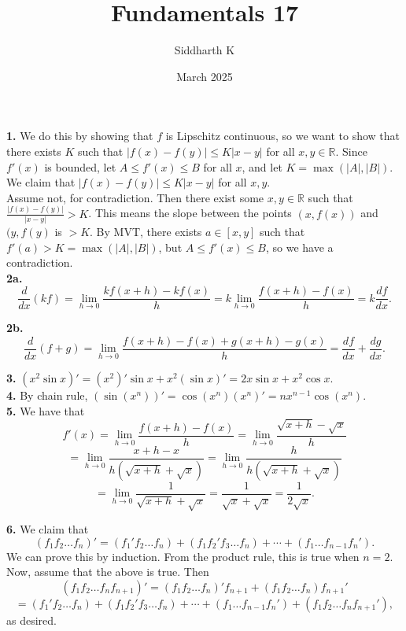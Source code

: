 \documentclass{article}
\title{Fundamentals 17}
\author{Siddharth K}
\date{March 2025}
\newcommand{\R}{\mathbb{R}}
\begin{document}
\maketitle

\textbf{1.} We do this by showing that $f$ is Lipschitz continuous, so we want to show that there exists $K$ such that $|f(x) - f(y)| \le K|x - y|$ for all $x, y \in \R$. Since $f'(x)$ is bounded, let $A \le f'(x) \le B$ for all $x$, and let $K = \max(|A|, |B|)$. We claim that $|f(x) - f(y)| \le K|x - y|$ for all $x, y$. \\

Assume not, for contradiction. Then there exist some $x, y \in \R$ such that $\frac{|f(x) - f(y)|}{|x - y|} > K$. This means the slope between the points $(x, f(x))$ and $(y, f(y)$ is $> K$. By MVT, there exists $a \in [x, y]$ such that $f'(a) > K = \max(|A|, |B|)$, but $A \le f'(x) \le B$, so we have a contradiction. \\

\textbf{2a.} $$\frac{d}{dx}(kf) = \lim_{h\to 0} \frac{kf(x + h) - kf(x)}{h} = k\lim_{h\to 0} \frac{f(x + h) - f(x)}{h} = k\frac{df}{dx}.$$

\textbf{2b.} $$\frac{d}{dx}(f + g) = \lim_{h\to 0} \frac{f(x + h) - f(x) + g(x + h) - g(x)}{h} = \frac{df}{dx} + \frac{dg}{dx}.$$

\textbf{3.} $(x^2\sin x)' = (x^2)'\sin x + x^2(\sin x)' = 2x\sin x + x^2\cos x$. \\

\textbf{4.} By chain rule, $(\sin(x^n))' = \cos(x^n)(x^n)' = nx^{n - 1}\cos(x^n)$. \\

\textbf{5.} We have that
$$f'(x) = \lim_{h\to 0} \frac{f(x + h) - f(x)}{h} = \lim_{h\to 0} \frac{\sqrt{x + h} - \sqrt{x}}{h}$$
$$= \lim_{h\to 0} \frac{x + h - x}{h(\sqrt{x + h} + \sqrt{x})} = \lim_{h\to 0} \frac{h}{h(\sqrt{x + h} + \sqrt{x})}$$
$$= \lim_{h\to 0} \frac{1}{\sqrt{x + h} + \sqrt{x}} = \frac{1}{\sqrt{x} + \sqrt{x}} = \frac{1}{2\sqrt{x}}.$$

\textbf{6.} We claim that
$$(f_1f_2\ldots f_n)' = (f_1'f_2\ldots f_n) + (f_1f_2'f_3\ldots f_n) + \cdots + (f_1\ldots f_{n - 1}f_n').$$
We can prove this by induction. From the product rule, this is true when $n = 2$. Now, assume that the above is true. Then
$$(f_1f_2\ldots f_nf_{n + 1})' = (f_1f_2\ldots f_n)'f_{n + 1} + (f_1f_2\ldots f_n)f_{n + 1}'$$
$$= (f_1'f_2\ldots f_n) + (f_1f_2'f_3\ldots f_n) + \cdots + (f_1\ldots f_{n - 1}f_n') + (f_1f_2\ldots f_nf_{n + 1}'),$$
as desired. \\
\end{document}
